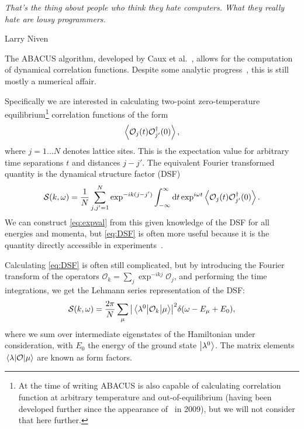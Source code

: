 \documentclass[11pt, a4paper]{report} %
\begin{document}
\epigraph{\textit{That's the thing about people who think they hate computers. What they really hate are lousy programmers.}}{Larry Niven}

The ABACUS algorithm, developed by Caux et al.~\cite{Caux2005, Caux2007, Caux2007a, Caux2005a}, allows for the computation of dynamical correlation functions.
Despite some analytic progress~\cite{Nardis2016,Nardis2015,slavnov90_noneq_time_curren_correl_funct}, this is still mostly a numerical affair.

Specifically we are interested in calculating two-point zero-temperature equilibrium\footnote{At the time of writing ABACUS is also capable of calculating correlation function at arbitrary temperature and out-of-equilibrium (having been developed further since the appearance of~\cite{Caux2009} in 2009), but we will not consider that here further.} correlation functions of the form
\begin{equation}\label{eq:expval}
	\expval{\mathcal{O}_j(t)\mathcal{O}_{j'}^{\dagger}(0)},
\end{equation}
where \(j=1\ldots N\) denotes lattice sites.
This is the expectation value for arbitrary time separations $t$ and distances $j-j'$.
The equivalent Fourier transformed quantity is the dynamical structure factor (DSF)
\begin{equation}\label{eq:DSF}
	\mathcal{S}(k,\omega) = \frac{1}{N} \sum_{j,j'=1}^{N} \exp^{-ik(j-j')} \int_{-\infty}^{\infty}\dd t \exp^{i\omega t}\expval{\mathcal{O}_j(t)\mathcal{O}_{j'}^{\dagger}(0)}.
\end{equation}
We can construct \cref{eq:expval} from this given knowledge of the DSF for all energies and momenta, but \cref{eq:DSF} is often more useful because it is the quantity directly accessible in experiments~\cite{Caux2009,Caux2007a}.

Calculating \cref{eq:DSF} is often still complicated, but by introducing the Fourier transform of the operators $\mathcal{O}_k=\sum_j \exp^{-ikj} \mathcal{O}_j$, and performing the time integrations, we get the Lehmann series representation of the DSF:
\begin{equation}
  \mathcal{S}(k,\omega) = \frac{2\pi}{N}\sum_{\mu}\abs{\mel{\lambda^0}{\mathcal{O}_k}{\mu}}^2 \delta(\omega-E_{\mu}+E_0), 
\end{equation}
where we sum over intermediate eigenstates of the Hamiltonian under consideration, with $E_0$ the energy of the ground state $\ket{\lambda^0}$.
The matrix elements $\mel{\lambda}{\mathcal{O}}{\mu}$ are known as form factors.
\end{document}
